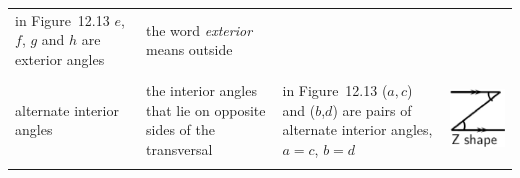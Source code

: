 \begin{center}
\begin{xtabular*}{\mytablewidth}[t]{|p{3cm}|p{3cm}|p{3cm}|p{20\mystarwidth}|}
        in Figure~12.13 $e$, \begin{math}f\end{math}, \begin{math}g\end{math} and \begin{math}h\end{math} are exterior angles &
        the word \textsl{exterior} means outside%
     \tabularnewline{}
        alternate interior angles &
        the interior angles that lie on opposite sides of the transversal &
        in Figure~12.13 ($a,c$) and (\begin{math}b\end{math},\begin{math}d\end{math}) are pairs of alternate interior angles, \begin{math}a=c\end{math}, \begin{math}b=d\end{math} &
    \setcounter{subfigure}{0}
\label{m39370*id316794}
    \begin{center}
    \label{m39370*id316794!!!underscore!!!media}\label{m39370*id316794!!!underscore!!!printimage}\includegraphics{col11306.imgs/m39370_MG10C13_012.png} %

\end{center}
\end{xtabular*}
\end{center}
